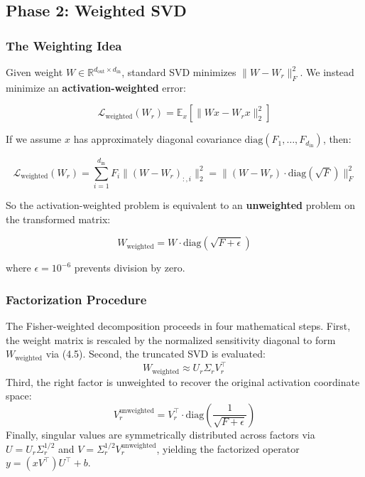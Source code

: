 \subsection{Phase 2: Weighted SVD}
\label{sec:fisher_weighted_svd}

\subsubsection{The Weighting Idea}

Given weight $W \in \mathbb{R}^{d_\text{out} \times d_\text{in}}$, standard 
SVD minimizes $\|W - W_r\|_F^2$. We instead minimize an \textbf{activation-weighted} 
error:

\[
\mathcal{L}_\text{weighted}(W_r) = \mathbb{E}_x\!\left[\|W x - W_r x\|_2^2\right]
\tag{4.3}
\]

If we assume $x$ has approximately diagonal covariance 
$\mathrm{diag}(F_1, \dots, F_{d_\text{in}})$, then:

\[
\mathcal{L}_\text{weighted}(W_r) = \sum_{i=1}^{d_\text{in}} F_i \|(W - W_r)_{:, i}\|_2^2 = \|(W - W_r) \cdot \mathrm{diag}(\sqrt{F})\|_F^2
\tag{4.4}
\]

So the activation-weighted problem is equivalent to an \textbf{unweighted} problem 
on the transformed matrix:

\[
W_\text{weighted} = W \cdot \mathrm{diag}(\sqrt{F + \epsilon})
\tag{4.5}
\]

where $\epsilon = 10^{-6}$ prevents division by zero.

\subsubsection{Factorization Procedure}

The Fisher-weighted decomposition proceeds in four mathematical steps. First, the weight matrix is rescaled by the normalized sensitivity diagonal to form $W_\text{weighted}$ via (4.5). Second, the truncated SVD is evaluated:
\begin{equation}
W_\text{weighted} \approx U_r \Sigma_r V_r^\top
\tag{4.6}
\end{equation}
Third, the right factor is unweighted to recover the original activation coordinate space:
\begin{equation}
V_r^\text{unweighted} = V_r^\top \cdot \mathrm{diag}\left(\frac{1}{\sqrt{F + \epsilon}}\right)
\tag{4.7}
\end{equation}
Finally, singular values are symmetrically distributed across factors via $U = U_r \Sigma_r^{1/2}$ and $V = \Sigma_r^{1/2} V_r^\text{unweighted}$, yielding the factorized operator $y = (x V^\top) U^\top + b$.

